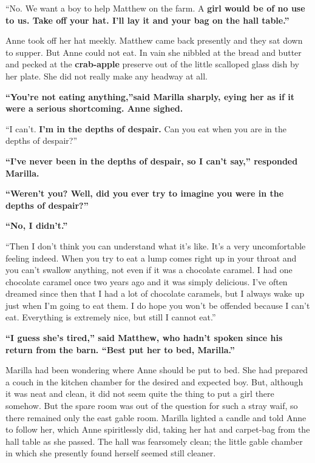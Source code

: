 \documentclass[a4paper]{article}
\begin{document}

``No. We want a boy to help Matthew on the farm. A \bfseries girl \mdseries would be of no use to us. Take off your hat. I'll lay it and your bag on the hall table.''

Anne took off her hat meekly. Matthew came back presently and they sat down to supper. But Anne could not eat. In vain she nibbled at the bread and butter and pecked at the {\bfseries crab-apple} preserve out of the little scalloped glass dish by her plate. She did not really make any headway at all.

\bfseries ``You're not eating anything,''\mdseries said Marilla sharply, eying her as if it were a serious shortcoming. Anne sighed.

``I can't. {\bfseries I'm in the depths of despair.} Can you eat when you are in the depths of despair?''

\bfseries ``I've never been in the depths of despair, so I can't say,'' responded Marilla.\mdseries

{\bfseries ``Weren't you? Well, did you ever try to imagine you were in the depths of despair?''}

\bfseries ``No, I didn't.''

``Then I don't think you can understand what it's like. It's a very uncomfortable feeling indeed. When you try to eat a lump comes right up in your throat and you can't swallow anything, not even if it was a chocolate caramel. I had one chocolate caramel once two years ago and it was simply delicious. I've often dreamed since then that I had a lot of chocolate caramels, but I always wake up just when I'm going to eat them. I do hope you won't be offended because I can't eat. Everything is extremely nice, but still I cannot eat.''\mdseries

{\bfseries ``I guess she's tired,'' said Matthew, who hadn't spoken since his return from the barn. ``Best put her to bed, Marilla.''

Marilla had been wondering where Anne should be put to bed. She had prepared a couch in the kitchen chamber for the desired and expected boy. But, although it was neat and clean, it did not seem quite the thing to put a girl there somehow. But the spare room was out of the question for such a stray waif, so there remained only the east gable room. Marilla lighted a candle and told Anne to follow her, which Anne spiritlessly did, taking her hat and carpet-bag from the hall table as she passed. The hall was fearsomely clean; the little gable chamber in which she presently found herself seemed still cleaner.}
\end{document}

